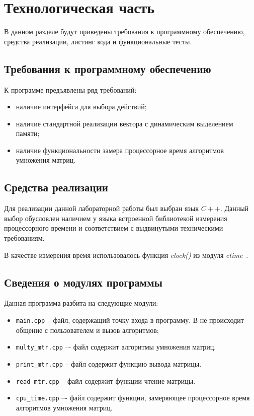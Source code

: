 \chapter{Технологическая часть}

В данном разделе будут приведены требования к программному обеспечению, средства реализации, листинг кода и функциональные тесты.

\section{Требования к программному обеспечению}

К программе предъявлены ряд требований:

\begin{itemize}[label=---]
	\item наличие интерфейса для выбора действий;
	\item наличие стандартной реализации вектора с динамическим выделением памяти;
	\item наличие функциональности замера процессорное время алгоритмов умножения матриц.
\end{itemize}

\section{Средства реализации}

Для реализации данной лабораторной работы был выбран язык $C++$\cite{cpp-lang}. Данный выбор обусловлен  наличием у языка встроенной библиотекой измерения процессорного времени и соответствием с выдвинутыми техническими требованиям.

В качестве измерения время использовалось функция \textit{clock()} из модуля \textit{ctime}~\cite{cpp-lang-time}. 

\clearpage

\section{Сведения о модулях программы}

Данная программа разбита на следующие модули:

\begin{itemize}[label=---]
	\item \texttt{main.cpp} -- файл, содержащий точку входа в программу. В не происходит общение с пользователем и вызов алгоритмов;
	\item \texttt{multy\_mtr.cpp} –- файл содержит алгоритмы умножения матриц.
	\item \texttt{print\_mtr.cpp} -- файл содержит функцию вывода матрицы.
	\item \texttt{read\_mtr.cpp} -- файл содержит функции чтение матрицы.
	\item \texttt{cpu\_time.cpp} –- файл содержит функции, замеряющее процессорное время алгоритмов умножения матриц.
\end{itemize}

